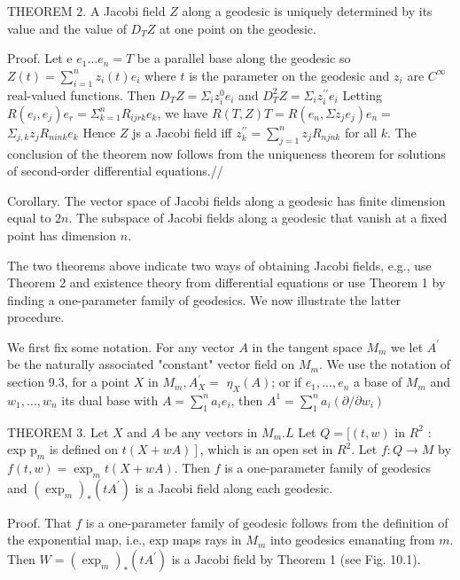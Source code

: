 \documentclass[10pt]{article}
\begin{document}
THEOREM 2. A Jacobi field $Z$ along a geodesic is uniquely determined by its value and the value of $D_{T} Z$ at one point on the geodesic.

Proof. Let e $e_{1} \ldots e_{n}=T$ be a parallel base along the geodesic so $Z(t)=\sum_{i=1}^{n} z_{i}(t) e_{i}$ where $t$ is the parameter on the geodesic and $z_{i}$ are $C^{\infty}$ real-valued functions. Then $D_{T} Z=\Sigma_{i} z_{i}^{0} e_{i}$ and $D_{T}^{2} Z=\Sigma_{i} z_{i}^{\prime \prime} e_{i}$ Letting $R\left(e_{i}, e_{j}\right) e_{r}=\Sigma_{k=1}^{n} R_{i j r k} e_{k}$, we have $R(T, Z) T=R\left(e_{n}, \Sigma z_{j} e_{j}\right) e_{n}=$ $\Sigma_{j, k} z_{j} R_{n i n k} e_{k}$ Hence $Z$ js a Jacobi field iff $z_{k}^{\prime \prime}=\sum_{j=1}^{n} z_{j} R_{n j n k}$ for all $k$. The conclusion of the theorem now follows from the uniqueness theorem for solutions of second-order differential equations.//

Corollary. The vector space of Jacobi fields along a geodesic has finite dimension equal to $2 n$. The subspace of Jacobi fields along a geodesic that vanish at a fixed point has dimension $n$.

The two theorems above indicate two ways of obtaining Jacobi fields, e.g., use Theorem 2 and existence theory from differential equations or use Theorem 1 by finding a one-parameter family of geodesics. We now illustrate the latter procedure.

We first fix some notation. For any vector $A$ in the tangent space $M_{m}$ we let $A^{\prime}$ be the naturally associated "constant" vector field on $M_{m}$. We use the notation of section $9.3$, for a point $X$ in $M_{m}, A_{X}^{\prime}=$ $\eta_{X}(A)$; or if $e_{1}, \ldots, e_{n}$ a base of $M_{m}$ and $w_{1}, \ldots, w_{n}$ its dual base with $A=\sum_{1}^{n} a_{i} e_{i}$, then $A^{1}=\sum_{1}^{n} a_{i}\left(\partial / \partial w_{i}\right)$

THEOREM 3. Let $X$ and $A$ be any vectors in $M_{m} . L$ Let $Q=[(t, w)$ in $R^{2}$ : exp $\mathrm{p}_{m}$ is defined on $\left.t(X+w A)\right]$, which is an open set in $R^{2}$. Let $f: Q \rightarrow M$ by $f(t, w)=\exp _{m} t(X+w A)$. Then $f$ is a one-parameter family of geodesics and $\left(\exp _{m}\right)_{*}\left(t A^{\prime}\right)$ is a Jacobi field along each geodesic.

Proof. That $f$ is a one-parameter family of geodesic follows from the definition of the exponential map, i.e., exp maps rays in $M_{m}$ into geodesics emanating from $m$. Then $W=\left(\exp _{m}\right)_{*}\left(t A^{\prime}\right)$ is a Jacobi field by Theorem 1 (see Fig. 10.1).
\end{document}
